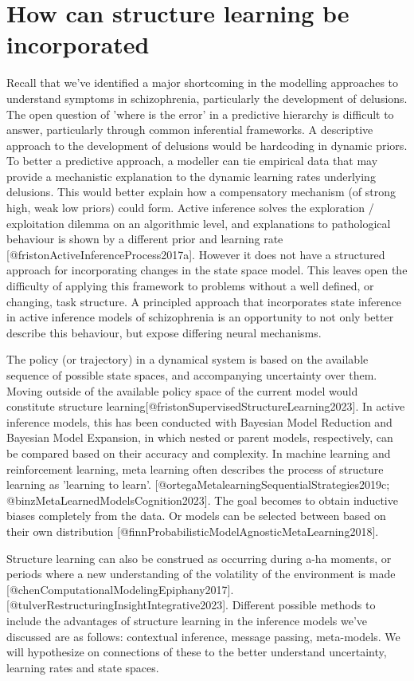 \documentclass{article}
\begin{document}
\section{How can structure learning be incorporated}\label{structure_learning}

Recall that we've identified a major shortcoming in the modelling approaches to understand symptoms in schizophrenia, particularly the development of delusions. The open question of 'where is the error' in a predictive hierarchy is difficult to answer, particularly through common inferential frameworks. A descriptive approach to the development of delusions would be hardcoding in dynamic priors. To better a predictive approach, a modeller can tie empirical data that may provide a mechanistic explanation to the dynamic learning rates underlying delusions. This would better explain how a compensatory mechanism (of strong high, weak low priors) could form.
Active inference solves the exploration / exploitation dilemma on an algorithmic level, and explanations to pathological behaviour is shown by a different prior and learning rate [@fristonActiveInferenceProcess2017a]. However it does not have a structured approach for incorporating changes in the state space model. This leaves open the difficulty of applying this framework to problems without a well defined, or changing, task structure. A principled approach that incorporates state inference in active inference models of schizophrenia is an opportunity to not only better describe this behaviour, but expose differing neural mechanisms.

The policy (or trajectory) in a dynamical system is based on the available sequence of possible state spaces, and accompanying uncertainty over them. Moving outside of the available policy space of the current model would constitute structure learning[@fristonSupervisedStructureLearning2023]. In active inference models, this has been conducted with Bayesian Model Reduction and Bayesian Model Expansion, in which nested or parent models, respectively, can be compared based on their accuracy and complexity. In machine learning and reinforcement learning, meta learning often describes the process of structure learning as 'learning to learn'. [@ortegaMetalearningSequentialStrategies2019c; @binzMetaLearnedModelsCognition2023]. The goal becomes to obtain inductive biases completely from the data. Or models can be selected between based on their own distribution [@finnProbabilisticModelAgnosticMetaLearning2018].

Structure learning can also be construed as occurring during a-ha moments, or periods where a new understanding of the volatility of the environment is made [@chenComputationalModelingEpiphany2017]. 
[@tulverRestructuringInsightIntegrative2023]. Different possible methods to include the advantages of structure learning in the inference models we've discussed are as follows: contextual inference, message passing, meta-models. We will hypothesize on connections of these to the better understand uncertainty, learning rates and state spaces.
\end{document}
